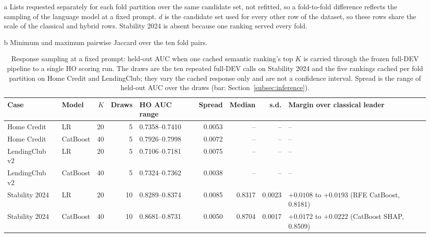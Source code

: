 \documentclass[final,5p,twocolumn]{elsarticle}
\newcommand{\Kfeat}{K}
\begin{document}
\begin{table}[htbp]
\begin{threeparttable}
\begin{tablenotes}
\item[a] Lists requested separately for each fold partition over the same candidate set, not refitted, so a fold-to-fold difference reflects the sampling of the language model at a fixed prompt. $d$ is the candidate set used for every other row of the dataset, so these rows share the scale of the classical and hybrid rows. Stability 2024 is absent because one ranking served every fold.
\item[b] Minimum and maximum pairwise Jaccard over the ten fold pairs.
\end{tablenotes}
\end{threeparttable}
\end{table}

\begin{table}[htbp]
\centering
\footnotesize
\begin{threeparttable}
\caption{Response sampling at a fixed prompt: held-out AUC when one cached semantic ranking's top $\Kfeat$ is carried through the frozen full-DEV pipeline to a single HO scoring run. The draws are the ten repeated full-DEV calls on Stability 2024 and the five rankings cached per fold partition on Home Credit and LendingClub; they vary the cached response only and are not a confidence interval. Spread is the range of held-out AUC over the draws (bar: Section~\ref{subsec:inference}).}
\label{tab:response_spread}
\setlength{\tabcolsep}{5pt}
\begin{tabular}{@{}llrrlrrrl@{}}
\toprule
Case & Model & $\Kfeat$ & Draws & HO AUC range & Spread & Median & s.d. & Margin over classical leader \\
\midrule
Home Credit & LR & 20 & 5 & 0.7358--0.7410 & 0.0053 & -- & -- & -- \\
Home Credit & CatBoost & 40 & 5 & 0.7926--0.7998 & 0.0072 & -- & -- & -- \\
LendingClub v2 & LR & 20 & 5 & 0.7106--0.7181 & 0.0075 & -- & -- & -- \\
LendingClub v2 & CatBoost & 40 & 5 & 0.7324--0.7362 & 0.0038 & -- & -- & -- \\
\addlinespace
Stability 2024 & LR & 20 & 10 & 0.8289--0.8374 & 0.0085 & 0.8317 & 0.0023 & $+0.0108$ to $+0.0193$ (RFE CatBoost, 0.8181) \\
Stability 2024 & CatBoost & 40 & 10 & 0.8681--0.8731 & 0.0050 & 0.8704 & 0.0017 & $+0.0172$ to $+0.0222$ (CatBoost SHAP, 0.8509) \\
\bottomrule
\end{tabular}
\begin{tablenotes}\footnotesize

\end{tablenotes}
\end{threeparttable}
\end{table}
\end{document}
